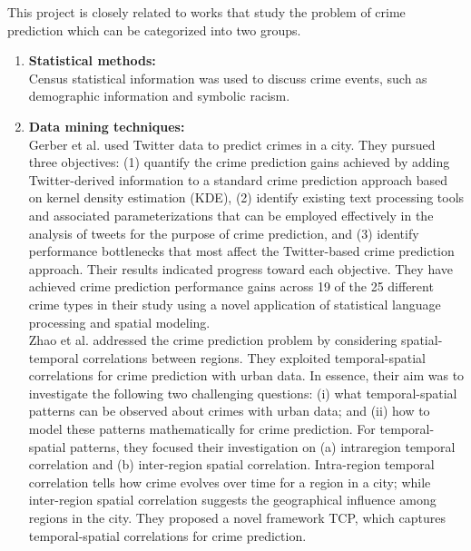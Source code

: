 This project is closely related to works that study the problem of 
crime prediction \cite{a3, p3} which can be categorized into two groups. 
\begin{enumerate}
    \item \textbf{Statistical methods:}\\[0.2cm]
    Census statistical information was used to discuss crime events, such 
    as demographic information and symbolic racism.\newpage
    
    \item \textbf{Data mining techniques:}\\[0.2cm]
    Gerber et al. \cite{a3} used Twitter data to predict crimes in a city. They pursued 
    three objectives: (1) quantify the crime prediction gains achieved by adding 
    Twitter-derived information to a standard crime prediction approach based on
     kernel density estimation (KDE), (2) identify existing text processing tools
      and associated parameterizations that can be employed effectively in the 
      analysis of tweets for the purpose of crime prediction, and (3) identify
       performance bottlenecks that most affect the Twitter-based crime prediction
        approach. Their results indicated progress toward each objective. They
         have achieved crime prediction performance gains across 19 of the 25 
         different crime types in their study using a novel application of 
         statistical language processing and spatial modeling.\\
    Zhao et al. \cite{p3} addressed the crime prediction problem by considering spatial-temporal
     correlations between regions. They exploited temporal-spatial
      correlations 
     for crime
    prediction with urban data. In essence, their aim was to investigate the following 
    two challenging questions: (i) what temporal-spatial patterns can be observed 
    about crimes with urban data; and (ii) how to model these patterns 
    mathematically for crime prediction. For temporal-spatial patterns, 
    they focused their investigation on (a) intraregion temporal correlation 
    and (b) inter-region spatial correlation. Intra-region temporal correlation 
    tells how crime evolves over time for a region in a city; while inter-region
     spatial correlation suggests the geographical influence among regions in the
      city. They proposed a novel framework TCP, which captures temporal-spatial 
      correlations for crime prediction.
\end{enumerate}

